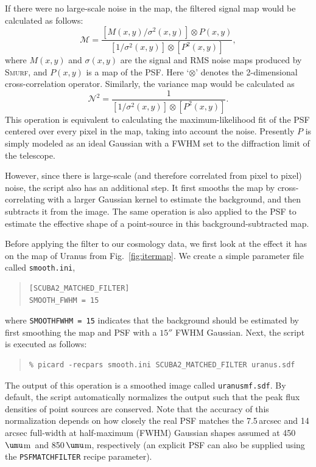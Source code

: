 \documentclass[twoside,11pt]{article}
\newcommand{\micron}{\mbox{\,${\umu}$m}}            %
\newcommand{\xref}[3]{#1}
\renewcommand{\_}{\texttt{\symbol{95}}}
\newenvironment{myquote}{\begin{quote}\begin{small}}{\end{small}\end{quote}}
\newcommand{\smurf}{\xref{\textsc{Smurf}}{sun258}{}}
\newcommand{\param}[1]{\texttt{#1}}
\begin{document}
If there were no large-scale noise in the map, the filtered signal map
would be calculated as follows:
%
\begin{equation}
\mathcal{M} = \frac{[M(x,y)/\sigma^2(x,y)] \otimes P(x,y)}
  {[1/\sigma^2(x,y)] \otimes [P^2(x,y)]},
\end{equation}
%
where $M(x,y)$ and $\sigma(x,y)$ are the signal and RMS
noise maps produced by \smurf, and $P(x,y)$ is a map of the
PSF. Here `$\otimes$' denotes the 2-dimensional cross-correlation
operator. Similarly, the variance map would be calculated as
%
\begin{equation}
  \mathcal{N}^2 = \frac{1}{[1/\sigma^2(x,y)] \otimes [P^2(x,y)]}.
\end{equation}
%
This operation is equivalent to calculating the maximum-likelihood fit
of the PSF centered over every pixel in the map, taking into account
the noise. Presently $P$ is simply modeled as an ideal Gaussian
with a FWHM set to the diffraction limit of the telescope.

However, since there is large-scale (and therefore correlated from
pixel to pixel) noise, the script also has an additional step. It
first smooths the map by cross-correlating with a larger Gaussian
kernel to estimate the background, and then subtracts it from the
image. The same operation is also applied to the PSF to estimate the
effective shape of a point-source in this background-subtracted map.

Before applying the filter to our cosmology data, we first look at the
effect it has on the map of Uranus from Fig.~\ref{fig:itermap}. We
create a simple parameter file called \texttt{smooth.ini},
\begin{myquote}
\begin{verbatim}
[SCUBA2_MATCHED_FILTER]
SMOOTH_FWHM = 15
\end{verbatim}
\end{myquote}
%
where \texttt{SMOOTH\_FWHM = 15} indicates that the background should
be estimated by first smoothing the map and PSF with a $15''$ FWHM
Gaussian. Next, the script is executed as follows:
%
\begin{myquote}
\begin{verbatim}
% picard -recpars smooth.ini SCUBA2_MATCHED_FILTER uranus.sdf
\end{verbatim}
\end{myquote}
%
The output of this operation is a smoothed image called
\texttt{uranus\_mf.sdf}. By default, the script automatically
normalizes the output such that the peak flux densities of point
sources are conserved. Note that the accuracy of this normalization
depends on how closely the real PSF matches the 7.5\,arcsec and
14\,arcsec full-width at half-maximum (FWHM) Gaussian shapes assumed
at 450\micron\ and 850\micron, respectively (an explicit PSF can
also be supplied using the \param{PSF\_MATCHFILTER} recipe
parameter).
\end{document}
